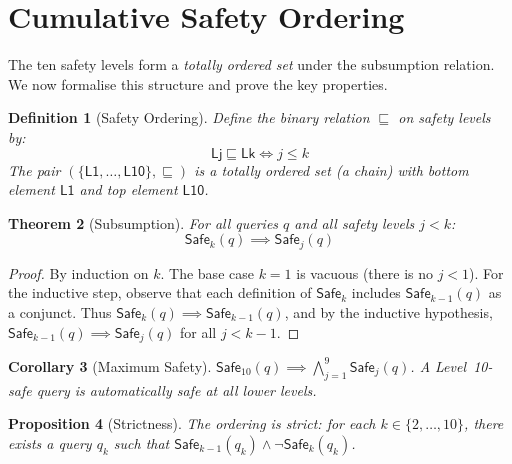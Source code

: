 \documentclass[11pt,a4paper]{article}
\newtheorem{theorem}{Theorem}[section]
\newtheorem{proposition}[theorem]{Proposition}
\newtheorem{corollary}[theorem]{Corollary}
\newtheorem{definition}[theorem]{Definition}
\newcommand{\LevelN}[1]{\textsf{L#1}}
\newcommand{\Safe}[1]{\ensuremath{\mathsf{Safe}_{#1}}}
\newcommand{\Leq}{\ensuremath{\sqsubseteq}}
\begin{document}
\section{Cumulative Safety Ordering}\label{sec:lattice}

The ten safety levels form a \emph{totally ordered set} under
the subsumption relation.  We now formalise this structure and
prove the key properties.

\begin{definition}[Safety Ordering]
Define the binary relation $\Leq$ on safety levels by:
\[
  \LevelN{j} \Leq \LevelN{k} \iff j \leq k
\]
The pair $(\{\LevelN{1}, \ldots, \LevelN{10}\}, \Leq)$ is a
totally ordered set (a chain) with bottom element $\LevelN{1}$
and top element $\LevelN{10}$.
\end{definition}

\begin{theorem}[Subsumption]
For all queries $q$ and all safety levels $j < k$:
\[
  \Safe{k}(q) \implies \Safe{j}(q)
\]
\end{theorem}

\begin{proof}
By induction on $k$.  The base case $k = 1$ is vacuous (there is
no $j < 1$).  For the inductive step, observe that each definition
of $\Safe{k}$ includes $\Safe{k-1}(q)$ as a conjunct.  Thus
$\Safe{k}(q) \implies \Safe{k-1}(q)$, and by the inductive
hypothesis, $\Safe{k-1}(q) \implies \Safe{j}(q)$ for all $j < k-1$.
\end{proof}

\begin{corollary}[Maximum Safety]
$\Safe{10}(q) \implies \bigwedge_{j=1}^{9} \Safe{j}(q)$.
A Level~10-safe query is automatically safe at all lower levels.
\end{corollary}

\begin{proposition}[Strictness]
The ordering is strict: for each $k \in \{2, \ldots, 10\}$, there
exists a query $q_k$ such that $\Safe{k-1}(q_k) \land \neg
\Safe{k}(q_k)$.
\end{proposition}
\end{document}
